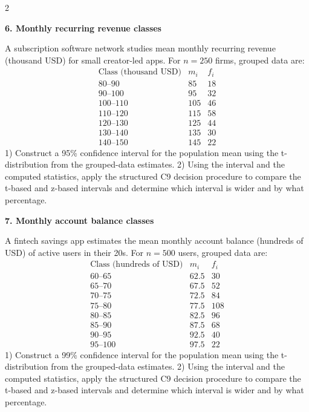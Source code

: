 \documentclass[12pt]{article}
\newcommand{\SubsectionBox}[1]{%
\noindent\colorbox{gray!30}{%
\parbox{\dimexpr\linewidth-2\fboxsep\relax}{\textbf{#1}}%
}\par\vspace{0.35cm}%
}
\begin{document}
\begin{multicols}{2}
		\vspace{0.25cm}
		\SubsectionBox{6. Monthly recurring revenue classes}\vspace{-0.25cm}
		A subscription software network studies mean monthly recurring revenue (thousand USD) for small creator-led apps.
		For $n=250$ firms, grouped data are:
		\[
		\begin{array}{c|c|c}
		\text{Class (thousand USD)} & m_i & f_i\\\hline
		80\text{--}90 & 85 & 18\\
		90\text{--}100 & 95 & 32\\
		100\text{--}110 & 105 & 46\\
		110\text{--}120 & 115 & 58\\
		120\text{--}130 & 125 & 44\\
		130\text{--}140 & 135 & 30\\
		140\text{--}150 & 145 & 22
		\end{array}
		\]
		1) Construct a 95\% confidence interval for the population mean using the t-distribution from the grouped-data estimates.
		2) Using the interval and the computed statistics, apply the structured C9 decision procedure to compare the t-based and z-based intervals and determine which interval is wider and by what percentage.
		
		\vspace{0.25cm}
		\SubsectionBox{7. Monthly account balance classes}\vspace{-0.25cm}
		A fintech savings app estimates the mean monthly account balance (hundreds of USD) of active users in their 20s.
		For $n=500$ users, grouped data are:
		\[
		\begin{array}{c|c|c}
		\text{Class (hundreds of USD)} & m_i & f_i\\\hline
		60\text{--}65 & 62.5 & 30\\
		65\text{--}70 & 67.5 & 52\\
		70\text{--}75 & 72.5 & 84\\
		75\text{--}80 & 77.5 & 108\\
		80\text{--}85 & 82.5 & 96\\
		85\text{--}90 & 87.5 & 68\\
		90\text{--}95 & 92.5 & 40\\
		95\text{--}100 & 97.5 & 22
		\end{array}
		\]
		1) Construct a 99\% confidence interval for the population mean using the t-distribution from the grouped-data estimates.
		2) Using the interval and the computed statistics, apply the structured C9 decision procedure to compare the t-based and z-based intervals and determine which interval is wider and by what percentage.
		

\end{multicols}
\end{document}
